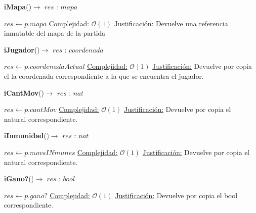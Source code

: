 \documentclass[10pt,a4paper]{article}
\begin{document}
\begin{Algoritmos}
    \begin{algorithm}{\textbf{iMapa}()$\to$ $res$ : $mapa$}
        \begin{algorithmic}
            \State $res \gets p.mapa$
            \Statex \underline{Complejidad:} $\mathcal{O}(1)$
            \Statex \underline{Justificación:} Devuelve una referencia inmutable del mapa de la partida
        \end{algorithmic}
    \end{algorithm}
    
    \begin{algorithm}{\textbf{iJugador}()$\to$ $res$ : $coordenada$}
        \begin{algorithmic}
            \State $res \gets p.coordenadaActual$
            \Statex \underline{Complejidad:} $\mathcal{O}(1)$
            \Statex \underline{Justificación:} Devuelve por copia el la coordenada correspondiente a la que se encuentra el jugador.
        \end{algorithmic}
    \end{algorithm}
    
    \begin{algorithm}{\textbf{iCantMov}()$\to$ $res$ : $nat$}
        \begin{algorithmic}
            \State $res \gets p.cantMov$
            \Statex \underline{Complejidad:} $\mathcal{O}(1)$
            \Statex \underline{Justificación:} Devuelve por copia el natural correspondiente.
        \end{algorithmic}
    \end{algorithm}
    
    \begin{algorithm}{\textbf{iInmunidad}()$\to$ $res$ : $nat$}
        \begin{algorithmic}
            \State $res \gets p.movsINmunes$
            \Statex \underline{Complejidad:} $\mathcal{O}(1)$
            \Statex \underline{Justificación:} Devuelve por copia el natural correspondiente.
        \end{algorithmic}
    \end{algorithm}
    
    \begin{algorithm}{\textbf{iGano?}()$\to$ $res$ : $bool$}
        \begin{algorithmic}
            \State $res \gets p.gano?$
            \Statex \underline{Complejidad:} $\mathcal{O}(1)$
            \Statex \underline{Justificación:} Devuelve por copia el bool correspondiente.
        \end{algorithmic}
    \end{algorithm}
    

\end{Algoritmos}
\end{document}
